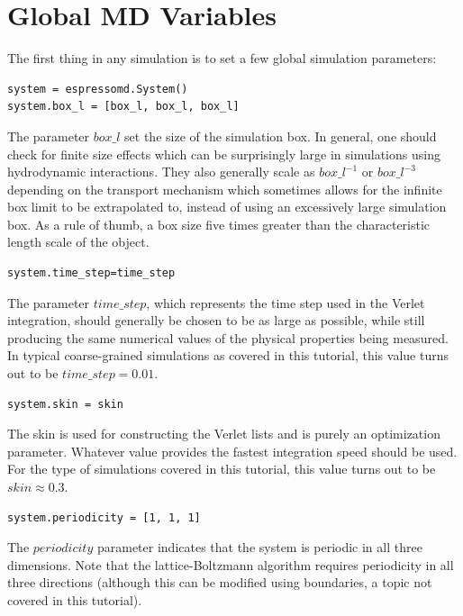 \documentclass[
paper=a4,                       %
fontsize=11pt,                  %
twoside,                        %
footsepline,                    %
headsepline,                    %
headinclude=false,              %
footinclude=false,              %
pagesize,                       %
]{scrartcl}
\begin{document}
\section{Global MD Variables}\label{sec:espresso}

  The first thing in any \es{} simulation is to set a few global simulation parameters:

{\small\vspace{0,2cm}
\begin{lstlisting}
system = espressomd.System()
system.box_l = [box_l, box_l, box_l]
\end{lstlisting}\vspace{0,2cm}
}

The parameter $box\_l$ set the size of the simulation box. In general, one should check for finite
size effects which can be surprisingly large in simulations using hydrodynamic interactions. They
also generally scale as $box\_l^{-1}$ or $box\_l^{-3}$ depending on the transport mechanism
which sometimes allows for the infinite box limit to be extrapolated to, instead of using an
excessively large simulation box. As a rule of thumb, a box size five times greater than the characteristic
length scale of the object. 
{\small\vspace{0,2cm}
\begin{lstlisting}[numbers=none]
system.time_step=time_step
\end{lstlisting}\vspace{0,2cm}
}
The parameter $time\_step$, which represents the time step used in the Verlet
integration, should generally be chosen to be as large as possible, while still producing the same numerical
values of the physical properties being measured. In typical coarse-grained simulations as
covered in this tutorial, this value turns out to be $time\_step=0.01$.
{\small\vspace{0,2cm}
\begin{lstlisting}[numbers=none]
system.skin = skin
\end{lstlisting}\vspace{0,2cm}
}
 The skin is used for constructing
the Verlet lists and is purely an optimization parameter. Whatever value provides the fastest
integration speed should be used. For the type of simulations covered in this tutorial, this value turns out
to be $skin \approx 0.3$.
{\small\vspace{0,2cm}
\begin{lstlisting}[numbers=none]
system.periodicity = [1, 1, 1]
\end{lstlisting}\vspace{0,2cm}
}
The $periodicity$ parameter indicates that the system is periodic in all three
dimensions. Note that the lattice-Boltzmann algorithm requires periodicity in all three directions (although
this can be modified using boundaries, a topic not covered in this tutorial). 
\end{document}
